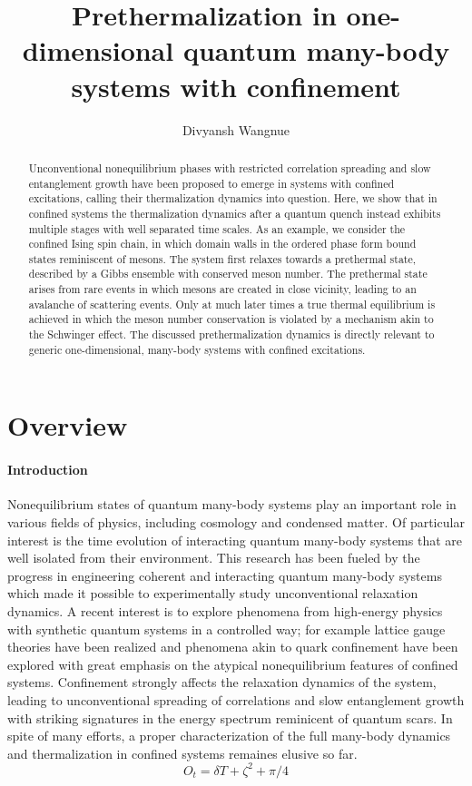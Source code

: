 \documentclass{article}
\title{\textbf{Prethermalization in one-dimensional quantum many-body systems with confinement}}
\author{Divyansh Wangnue}
\date{}
\begin{document}
\maketitle
\begin{abstract} 
Unconventional nonequilibrium phases with restricted correlation spreading and slow entanglement growth have been proposed to emerge in systems with confined excitations, calling their thermalization dynamics into question. Here, we show that in confined systems the thermalization dynamics after a quantum quench instead exhibits multiple stages with well separated time scales. As an example, we consider the confined Ising spin chain, in which domain walls in the ordered phase form bound states reminiscent of mesons. The system first relaxes towards a prethermal state, described by a Gibbs ensemble with conserved meson number. The prethermal state arises from rare events in which mesons are created in close vicinity, leading to an avalanche of scattering events. Only at much later times a true thermal equilibrium is achieved in which the meson number conservation is violated by a mechanism akin to the Schwinger effect. The discussed prethermalization dynamics is directly relevant to generic one-dimensional, many-body systems with confined excitations.
 \end{abstract}





\section{Overview}
\paragraph{Introduction}
Nonequilibrium states of quantum many-body systems play an important role in various fields of physics, including cosmology and condensed matter. Of particular interest is the time evolution of interacting quantum many-body systems that are well isolated from their environment. This research has been fueled by the progress in engineering coherent and interacting quantum many-body systems which made it possible to experimentally study unconventional relaxation dynamics. A recent interest is to explore phenomena from high-energy physics with synthetic quantum systems in a controlled way; for example lattice gauge theories have been realized and phenomena akin to quark confinement have been explored with great emphasis on the atypical nonequilibrium features of confined systems. Confinement strongly affects the relaxation dynamics of the system, leading to unconventional spreading of correlations and slow entanglement growth\cite{abc} with striking signatures in the energy spectrum reminicent of quantum scars. In spite of many efforts, a proper characterization of the full many-body dynamics and thermalization\cite{def} in confined systems remaines elusive so far.
\begin{equation}
O_t= \delta T  + \zeta ^ 2+ \pi /4 
\end{equation}
\end{document}
